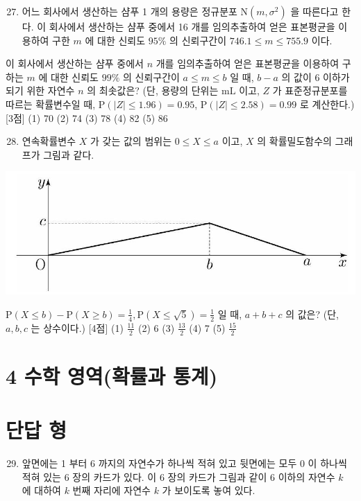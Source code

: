 \documentclass[10pt]{article}
\begin{document}
\begin{enumerate}
  \setcounter{enumi}{26}
  \item 어느 회사에서 생산하는 샴푸 1 개의 용량은 정규분포 $\mathrm{N}\left(m, \sigma^{2}\right)$ 을 따른다고 한다. 이 회사에서 생산하는 샴푸 중에서 16 개를 임의추출하여 얻은 표본평균을 이용하여 구한 $m$ 에 대한 신뢰도 $95 \%$ 의 신뢰구간이 $746.1 \leq m \leq 755.9$ 이다.
\end{enumerate}

이 회사에서 생산하는 샴푸 중에서 $n$ 개를 임의추출하여 얻은 표본평균을 이용하여 구하는 $m$ 에 대한 신뢰도 $99 \%$ 의 신뢰구간이 $a \leq m \leq b$ 일 때, $b-a$ 의 값이 6 이하가 되기 위한 자연수 $n$ 의 최솟값은? (단, 용량의 단위는 $\mathrm{mL}$ 이고, $Z$ 가 표준정규분포를 따르는 확률변수일 때, $\mathrm{P}(|Z| \leq 1.96)=0.95$, $\mathrm{P}(|Z| \leq 2.58)=0.99$ 로 계산한다.) [3점]
(1) 70
(2) 74
(3) 78
(4) 82
(5) 86

\begin{enumerate}
  \setcounter{enumi}{27}
  \item 연속확률변수 $X$ 가 갖는 값의 범위는 $0 \leq X \leq a$ 이고, $X$ 의 확률밀도함수의 그래프가 그림과 같다.
\end{enumerate}

\begin{center}
\includegraphics[max width=\textwidth]{2023_05_19_a9cef858603f6abf5411g-31}
\end{center}

$\mathrm{P}(X \leq b)-\mathrm{P}(X \geq b)=\frac{1}{4}, \mathrm{P}(X \leq \sqrt{5})=\frac{1}{2}$ 일 때, $a+b+c$ 의 값은? (단, $a, b, c$ 는 상수이다.) [4점]
(1) $\frac{11}{2}$
(2) 6
(3) $\frac{13}{2}$
(4) 7
(5) $\frac{15}{2}$

\section{4 수학 영역(확률과 통계)}
\section{단답 형}
\begin{enumerate}
  \setcounter{enumi}{28}
  \item 앞면에는 1 부터 6 까지의 자연수가 하나씩 적혀 있고 뒷면에는 모두 0 이 하나씩 적혀 있는 6 장의 카드가 있다. 이 6 장의 카드가 그림과 같이 6 이하의 자연수 $k$ 에 대하여 $k$ 번째 자리에 자연수 $k$ 가 보이도록 놓여 있다.
\end{enumerate}
\end{document}
